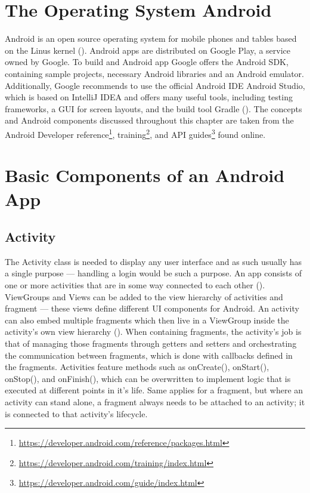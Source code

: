 \section{The Operating System Android}
Android is an open source operating system for mobile phones and tables based on the Linus kernel (\cite{androiddef}). Android apps are distributed on Google Play, a service owned by Google. To build and Android app Google offers the Android \gls{SDK}, containing sample projects, necessary Android libraries and an Android emulator. Additionally, Google recommends to use the official Android \gls{IDE} Android Studio, which is based on IntelliJ IDEA and offers many useful tools, including testing frameworks, a \gls{GUI} for screen layouts, and the build tool Gradle (\cite{androidstudio}). The concepts and Android components discussed throughout this chapter are taken from the Android Developer reference\footnote{\url{https://developer.android.com/reference/packages.html}}, training\footnote{\url{https://developer.android.com/training/index.html}}, and \gls{API} guides\footnote{\url{https://developer.android.com/guide/index.html}} found online.

\section{Basic Components of an Android App}

\subsection{Activity}
The Activity class is needed to display any user interface and as such usually has a single purpose --- handling a login would be such a purpose. An app consists of one or more activities that are in some way connected to each other (\cite{activities_in_app}). ViewGroups and Views can be added to the view hierarchy of activities and fragment --- these views define different UI components for Android. An activity can also embed multiple fragments which then live in a ViewGroup inside the activity's own view hierarchy (\cite{androidfragment}). When containing fragments, the activity’s job is that of managing those fragments through getters and setters and orchestrating the communication between fragments, which is done with callbacks defined in the fragments. 
Activities feature methods such as onCreate(), onStart(), onStop(), and onFinish(), which can be overwritten to implement logic that is executed at different points in it’s life. Same applies for a fragment, but where an activity can stand alone, a fragment always needs to be attached to an activity; it is connected to that activity's lifecycle.

